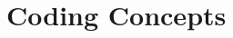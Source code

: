 \begin{landscape}
    
\end{landscape}
\section{Coding Concepts}



\printbibliography\cleardoublepage


